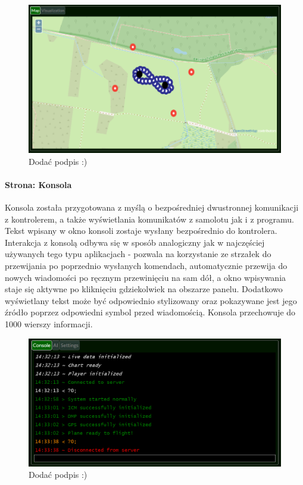 \documentclass[12pt, a4paper]{article}
\begin{document}
 \begin{figure}[H]
    \centering
    \includegraphics[width=1\textwidth]{mapa}
    \caption{Dodać podpis :)}
\end{figure}


\paragraph{Strona: Konsola}\mbox{}

Konsola została przygotowana z myślą o bezpośredniej dwustronnej komunikacji z kontrolerem, a także wyświetlania komunikatów z samolotu jak i z programu. Tekst wpisany w okno konsoli zostaje wysłany bezpośrednio do kontrolera. Interakcja z konsolą odbywa się w sposób analogiczny jak w najczęściej używanych tego typu aplikacjach - pozwala na korzystanie ze strzałek do przewijania po poprzednio wysłanych komendach, automatycznie przewija do nowych wiadomości po ręcznym przewinięciu na sam dół, a okno wpisywania staje się aktywne po kliknięciu gdziekolwiek na obszarze panelu. Dodatkowo wyświetlany tekst może być odpowiednio stylizowany oraz pokazywane jest jego źródło poprzez odpowiedni symbol przed wiadomością. Konsola przechowuje do 1000 wierszy informacji.

 \begin{figure}[H]
    \centering
    \includegraphics[width=1\textwidth]{konsola}
    \caption{Dodać podpis :)}
\end{figure}
\end{document}
